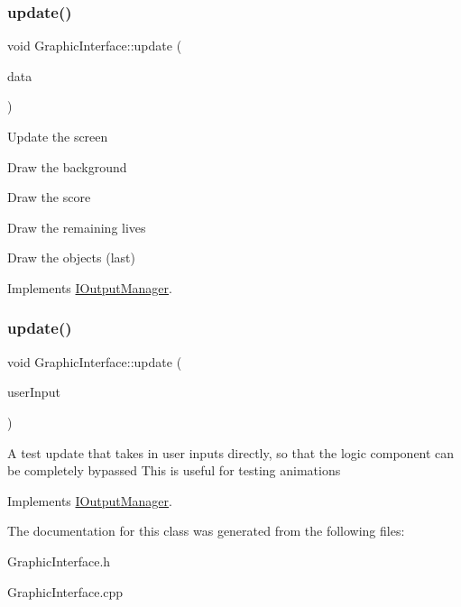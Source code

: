 \subsubsection{\texorpdfstring{update()}{update()}\hspace{0.1cm}{\footnotesize\ttfamily [1/2]}}
{\footnotesize\ttfamily void Graphic\+Interface\+::update (\begin{DoxyParamCaption}\item[{std\+::vector$<$ std\+::string $>$}]{data }\end{DoxyParamCaption})\hspace{0.3cm}{\ttfamily [virtual]}}

Update the screen
\begin{DoxyItemize}
\item Draw the background
\item Draw the score
\item Draw the remaining lives
\item Draw the objects (last) 
\end{DoxyItemize}

Implements \mbox{\hyperlink{class_i_output_manager_aaebb6c7029ac00c7ce293272a5e854e3}{I\+Output\+Manager}}.

\mbox{\label{class_graphic_interface_abb3581948def6522f616e9f3ce1c40ac}} 
\subsubsection{\texorpdfstring{update()}{update()}\hspace{0.1cm}{\footnotesize\ttfamily [2/2]}}
{\footnotesize\ttfamily void Graphic\+Interface\+::update (\begin{DoxyParamCaption}\item[{User\+Input\+Type}]{user\+Input }\end{DoxyParamCaption})\hspace{0.3cm}{\ttfamily [virtual]}}

A test update that takes in user inputs directly, so that the logic component can be completely bypassed This is useful for testing animations 

Implements \mbox{\hyperlink{class_i_output_manager_aef1aaf499f3eee5927cb2833af39ce43}{I\+Output\+Manager}}.



The documentation for this class was generated from the following files\+:\begin{DoxyCompactItemize}
\item 
Graphic\+Interface.\+h\item 
Graphic\+Interface.\+cpp\end{DoxyCompactItemize}
